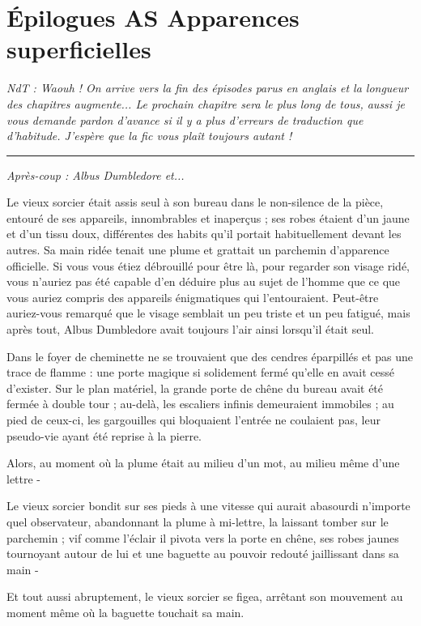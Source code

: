 
\chapter{Épilogues AS   Apparences superficielles}

\emph{NdT : Waouh ! On arrive vers la fin des épisodes parus en anglais et la longueur des chapitres augmente... Le prochain chapitre sera le plus long de tous, aussi je vous demande pardon d'avance si il y a plus d'erreurs de traduction que d'habitude. J'espère que la fic vous plaît toujours autant !} 
\par\noindent\rule{\textwidth}{0.4pt}
\emph{Après-coup : Albus Dumbledore et...} 

Le vieux sorcier était assis seul à son bureau dans le non-silence de la pièce, entouré de ses appareils, innombrables et inaperçus ; ses robes étaient d'un jaune et d'un tissu doux, différentes des habits qu'il portait habituellement devant les autres. Sa main ridée tenait une plume et grattait un parchemin d'apparence officielle. Si vous vous étiez débrouillé pour être là, pour regarder son visage ridé, vous n'auriez pas été capable d'en déduire plus au sujet de l'homme que ce que vous auriez compris des appareils énigmatiques qui l'entouraient. Peut-être auriez-vous remarqué que le visage semblait un peu triste et un peu fatigué, mais après tout, Albus Dumbledore avait toujours l'air ainsi lorsqu'il était seul.

Dans le foyer de cheminette ne se trouvaient que des cendres éparpillés et pas une trace de flamme : une porte magique si solidement fermé qu'elle en avait cessé d'exister. Sur le plan matériel, la grande porte de chêne du bureau avait été fermée à double tour ; au-delà, les escaliers infinis demeuraient immobiles ; au pied de ceux-ci, les gargouilles qui bloquaient l'entrée ne coulaient pas, leur pseudo-vie ayant été reprise à la pierre.

Alors, au moment où la plume était au milieu d'un mot, au milieu même d'une lettre -

Le vieux sorcier bondit sur ses pieds à une vitesse qui aurait abasourdi n'importe quel observateur, abandonnant la plume à mi-lettre, la laissant tomber sur le parchemin ; vif comme l'éclair il pivota vers la porte en chêne, ses robes jaunes tournoyant autour de lui et une baguette au pouvoir redouté jaillissant dans sa main -

Et tout aussi abruptement, le vieux sorcier se figea, arrêtant son mouvement au moment même où la baguette touchait sa main.

